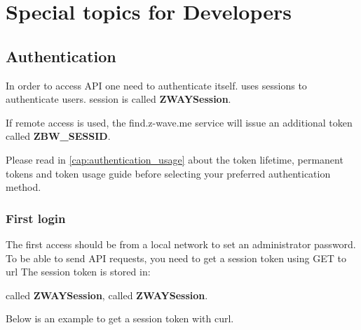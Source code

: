 \chapter{Special topics for Developers}

\section{Authentication}
\label{cap:authentication}

In order to access API one need to authenticate itself. \zway uses sessions
to authenticate users. \zway session is called \textbf{ZWAYSession}.

If remote access is used, the find.z-wave.me service will issue an additional token called \textbf{ZBW\_SESSID}.

Please read in \ref{cap:authentication_usage} about the token lifetime, permanent tokens and token usage guide before selecting your preferred authentication method.

\subsection{First login}
\label{cap:first_login}

The first access should be from a local network to set an administrator password.
To be able to send API requests, you need to get a session token using GET to url 
The session token is stored in:
\begin{itemize}
\header called \textbf{ZWAYSession},
\cookie called \textbf{ZWAYSession}.
\end{itemize}

Below is an example to get a session token with curl.
{\scriptsize
\begin{quote} 
\end{quote}
}

